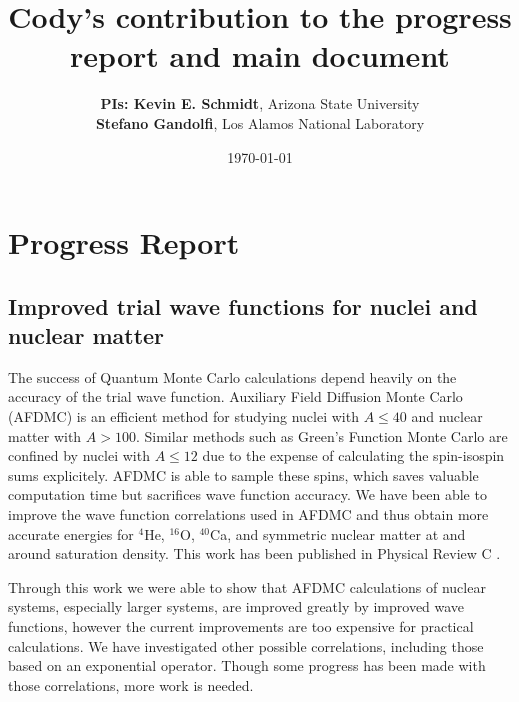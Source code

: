 \documentclass[12pt,letterpaper]{article}
\begin{document}
\onehalfspacing
\title{{\Large \textbf{Cody's contribution to the progress report and main document}} \vspace{-0.5cm}}
\author{
{\bf PIs: Kevin E. Schmidt}, Arizona State University \\
{\bf Stefano Gandolfi}, Los Alamos National Laboratory
}
\date{\today}
\maketitle

\vspace{-1.5cm}
\section{Progress Report}
\subsection{Improved trial wave functions for nuclei and nuclear matter}
The success of Quantum Monte Carlo calculations depend heavily on the accuracy of the trial wave function. Auxiliary Field Diffusion Monte Carlo (AFDMC) is an efficient method for studying nuclei with $A\le40$ and nuclear matter with $A>100$. Similar methods such as Green's Function Monte Carlo are confined by nuclei with $A\le12$ due to the expense of calculating the spin-isospin sums explicitely. AFDMC is able to sample these spins, which saves valuable computation time but sacrifices wave function accuracy. We have been able to improve the wave function correlations used in AFDMC and thus obtain more accurate energies for $^4$He, $^{16}$O, $^{40}$Ca, and symmetric nuclear matter at and around saturation density. This work has been published in Physical Review C \cite{lonardoni2018}.

Through this work we were able to show that AFDMC calculations of nuclear systems, especially larger systems, are improved greatly by improved wave functions, however the current improvements are too expensive for practical calculations. We have investigated other possible correlations, including those based on an exponential operator. Though some progress has been made with those correlations, more work is needed.
\end{document}
